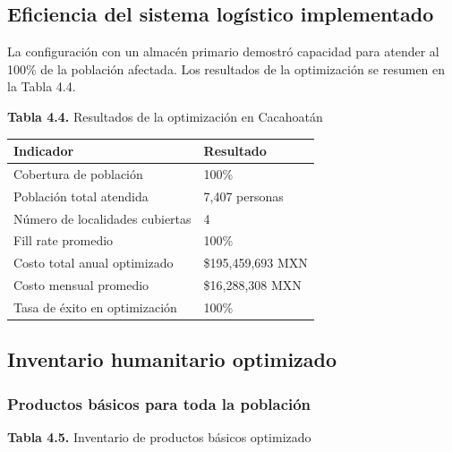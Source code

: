 \documentclass[
  spanish,
  us-letterpaper,
]{scrreprt}
\numberwithin{equation}{chapter} %
\begin{document}
\subsection{Eficiencia del sistema logístico
implementado}\label{eficiencia-del-sistema-loguxedstico-implementado}

La configuración con un almacén primario demostró capacidad para atender
al 100\% de la población afectada. Los resultados de la optimización se
resumen en la Tabla 4.4.

\textbf{Tabla 4.4.} Resultados de la optimización en Cacahoatán

\begin{longtable}[]{@{}ll@{}}
\toprule\noalign{}
Indicador & Resultado \\
\midrule\noalign{}
\endhead
\bottomrule\noalign{}
\endlastfoot
Cobertura de población & 100\% \\
Población total atendida & 7,407 personas \\
Número de localidades cubiertas & 4 \\
Fill rate promedio & 100\% \\
Costo total anual optimizado & \$195,459,693 MXN \\
Costo mensual promedio & \$16,288,308 MXN \\
Tasa de éxito en optimización & 100\% \\
\end{longtable}

\subsection{Inventario humanitario
optimizado}\label{inventario-humanitario-optimizado}

\subsubsection{Productos básicos para toda la
población}\label{productos-buxe1sicos-para-toda-la-poblaciuxf3n}

\textbf{Tabla 4.5.} Inventario de productos básicos optimizado
\end{document}
